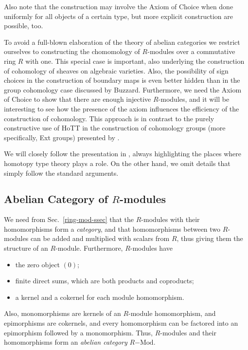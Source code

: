 \documentclass{amsart}
\theoremstyle{plain}
\numberwithin{equation}{section} %
\numberwithin{figure}{section} %
\theoremstyle{plain}
\theoremstyle{plain}
\theoremstyle{plain}
\theoremstyle{plain}
\theoremstyle{plain}
\theoremstyle{plain}
\theoremstyle{remark}
\theoremstyle{remark}
\theoremstyle{remark}
\begin{document}
Also note that the construction may involve the Axiom of Choice when done uniformly for all objects of a certain type, but more explicit construction are possible, too.

To avoid a full-blown elaboration of the theory of abelian categories we restrict ourselves to constructing the chomomology of $R$-modules over a commutative ring $R$ with one. This special case is important, also underlying the construction of cohomology of sheaves on algebraic varieties. Also, the possibility of sign choices in the construction of boundary maps is even better hidden than in the group cohomology case discussed by Buzzard. Furthermore, we need the Axiom of Choice to show that there are enough injective $R$-modules, and it will be interesting to see how the presence of the axiom influences the efficiency of the construction of cohomology. This approach is in contrast to the purely constructive use of HoTT in the construction of cohomology groups (more specifically, Ext groups) presented by \cite{CTF25}.

We will closely follow the presentation in \cite[III.1]{Hart:AG}, always highlighting the places where homotopy type theory plays a role. On the other hand, we omit details that simply follow the standard arguments.


\subsection{Abelian Category of $R$-modules}

We need from Sec.~\ref{ring-mod-ssec} that the $R$-modules with their homomorphisms form a \textit{category}, and that homomorphisms between two $R$-modules can be added and multiplied with scalars from $R$, thus giving them the structure of an $R$-module. Furthermore, $R$-modules have
\begin{itemize}
\item the zero object $(0)$;
\item finite direct sums, which are both products and coproducts;
\item a kernel and a cokernel for each module homomorphism.
\end{itemize}

Also, monomorphisms are kernels of an $R$-module homomorphism, and epimorphisms are cokernels, and every homomorphism can be factored into an epimorphism followed by a monomorphism. Thus, $R$-modules and their homomorphisms form an \textit{abelian category} $R\mathrm{-Mod}$.
\end{document}
